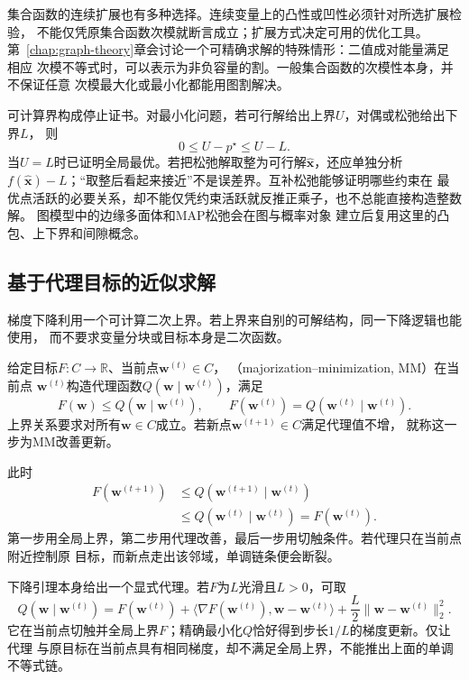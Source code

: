 集合函数的连续扩展也有多种选择。连续变量上的凸性或凹性必须针对所选扩展检验，
不能仅凭原集合函数次模就断言成立；扩展方式决定可用的优化工具。
第~\ref{chap:graph-theory}章会讨论一个可精确求解的特殊情形：二值成对能量满足相应
次模不等式时，可以表示为非负容量的割。一般集合函数的次模性本身，并不保证任意
次模最大化或最小化都能用图割解决。

可计算界构成停止证书。对最小化问题，若可行解给出上界$U$，对偶或松弛给出下界$L$，
则
\[
  0\leq U-p^\star\leq U-L.
\]
当$U=L$时已证明全局最优。若把松弛解取整为可行解$\widehat{\bm{x}}$，还应单独分析
$f(\widehat{\bm{x}})-L$；“取整后看起来接近”不是误差界。互补松弛能够证明哪些约束在
最优点活跃的必要关系，却不能仅凭约束活跃就反推正乘子，也不总能直接构造整数解。
图模型中的边缘多面体和MAP松弛会在图与概率对象
建立后复用这里的凸包、上下界和间隙概念。

\subsection{基于代理目标的近似求解}
\label{sec:opt-majorization-improvement}

梯度下降利用一个可计算二次上界。若上界来自别的可解结构，同一下降逻辑也能使用，
而不要求变量分块或目标本身是二次函数。
\begin{definition}[主化代理与MM更新]
\label{def:opt-majorization-minimization}
给定目标$F:C\to\mathbb R$、当前点$\bm w^{(t)}\in C$，
（majorization--minimization, MM）在当前点
$\bm{w}^{(t)}$构造代理函数$Q(\bm{w}\mid\bm{w}^{(t)})$，满足
\[
  F(\bm{w})\leq Q(\bm{w}\mid\bm{w}^{(t)}),
  \qquad
  F(\bm{w}^{(t)})=Q(\bm{w}^{(t)}\mid\bm{w}^{(t)}).
\]
上界关系要求对所有$\bm w\in C$成立。若新点$\bm w^{(t+1)}\in C$满足代理值不增，
就称这一步为MM改善更新。
\end{definition}
此时
\begin{align*}
  F(\bm{w}^{(t+1)})
  &\leq Q(\bm{w}^{(t+1)}\mid\bm{w}^{(t)})\\
  &\leq Q(\bm{w}^{(t)}\mid\bm{w}^{(t)})
  =F(\bm{w}^{(t)}).
\end{align*}
第一步用全局上界，第二步用代理改善，最后一步用切触条件。若代理只在当前点附近控制原
目标，而新点走出该邻域，单调链条便会断裂。

下降引理本身给出一个显式代理。若$F$为$L$光滑且$L>0$，可取
\[
  Q(\bm{w}\mid\bm{w}^{(t)})
  =F(\bm{w}^{(t)})
  +\langle\nabla F(\bm{w}^{(t)}),\bm{w}-\bm{w}^{(t)}\rangle
  +\frac{L}{2}\lVert\bm{w}-\bm{w}^{(t)}\rVert_2^2.
\]
它在当前点切触并全局上界$F$；精确最小化$Q$恰好得到步长$1/L$的梯度更新。仅让代理
与原目标在当前点具有相同梯度，却不满足全局上界，不能推出上面的单调不等式链。

